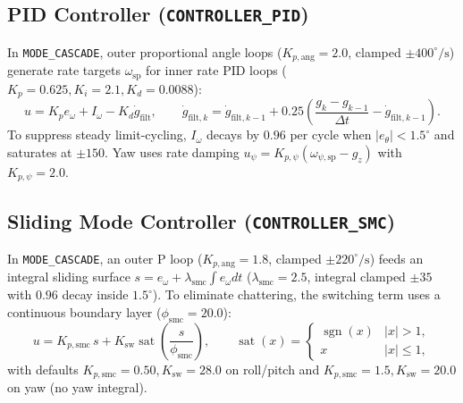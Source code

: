 \documentclass[11pt,a4paper]{article}
\begin{document}
\subsection{PID Controller (\texttt{CONTROLLER\_PID})}
In \texttt{MODE\_CASCADE}, outer proportional angle loops ($K_{p,\text{ang}} = 2.0$, clamped $\pm 400^\circ/\text{s}$) generate rate targets $\omega_{\text{sp}}$ for inner rate PID loops ($K_p = 0.625, K_i = 2.1, K_d = 0.0088$):
\begin{equation}
  u = K_p e_\omega + I_\omega - K_d \dot{g}_{\text{filt}}, \qquad
  \dot{g}_{\text{filt},k} = \dot{g}_{\text{filt},k-1} + 0.25\!\left(\frac{g_k - g_{k-1}}{\Delta t} - \dot{g}_{\text{filt},k-1}\right).
\end{equation}
To suppress steady limit-cycling, $I_\omega$ decays by $0.96$ per cycle when $|e_\theta| < 1.5^\circ$ and saturates at $\pm 150$. Yaw uses rate damping $u_\psi = K_{p,\psi}(\omega_{\psi,\text{sp}} - g_z)$ with $K_{p,\psi} = 2.0$.

\subsection{Sliding Mode Controller (\texttt{CONTROLLER\_SMC})}
In \texttt{MODE\_CASCADE}, an outer P loop ($K_{p,\text{ang}} = 1.8$, clamped $\pm 220^\circ/\text{s}$) feeds an integral sliding surface $s = e_\omega + \lambda_{\text{smc}}\int e_\omega dt$ ($\lambda_{\text{smc}} = 2.5$, integral clamped $\pm 35$ with $0.96$ decay inside $1.5^\circ$). To eliminate chattering, the switching term uses a continuous boundary layer ($\phi_{\text{smc}} = 20.0$):
\begin{equation}
  u = K_{p,\text{smc}}\, s + K_{\text{sw}}\operatorname{sat}\!\left(\frac{s}{\phi_{\text{smc}}}\right), \qquad
  \operatorname{sat}(x) = \begin{cases} \operatorname{sgn}(x) & |x| > 1, \\ x & |x| \le 1, \end{cases}
\end{equation}
with defaults $K_{p,\text{smc}} = 0.50, K_{\text{sw}} = 28.0$ on roll/pitch and $K_{p,\text{smc}} = 1.5, K_{\text{sw}} = 20.0$ on yaw (no yaw integral).
\end{document}
